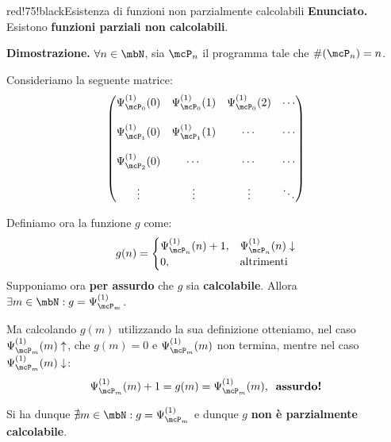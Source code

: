 \begin{halfframedbox}{red!75!black}{Esistenza di funzioni non parzialmente calcolabili}\label{Esistenza funzioni non calcolabili}
  \textbf{Enunciato. } Esistono \textbf{funzioni parziali non calcolabili}.

  \begin{center}
    \textcolor{red!75!black}{\hdashrule[0.5ex]{18cm}{1pt}{3mm 3pt 1mm 2pt}}
  \end{center}

  \textbf{Dimostrazione. } \(\forall n \in \mbN\), sia \(\mcP_n\) il programma tale che \(\# (\mcP_n)=n\).

  Consideriamo la seguente matrice:
\begin{eqnarray}
  \begin{pmatrix}
    \Psi_{\mcP_0}^{(1)}(0) & \Psi_{\mcP_0}^{(1)}(1) & \Psi_{\mcP_0}^{(1)}(2) & \cdots\\
    \\
    \Psi_{\mcP_1}^{(1)}(0) & \Psi_{\mcP_1}^{(1)}(1) & \cdots & \cdots\\
    \\
    \Psi_{\mcP_2}^{(1)}(0) & \cdots & \cdots & \cdots\\
    \\
    \vdots & \vdots & \vdots & \ddots
  \end{pmatrix}
\end{eqnarray}

  Definiamo ora la funzione \(g\) come:
  \begin{equation}
    g(n)=\begin{cases}
      \Psi_{\mcP_n}^{(1)}(n)+1, & \Psi_{\mcP_n}^{(1)}(n) \downarrow\\
      0, & \text{altrimenti}
    \end{cases}
  \end{equation}
  Supponiamo ora \textbf{per assurdo} che \(g\) sia \textbf{calcolabile}. Allora \(\exists m \in \mbN: g=\Psi_{\mcP_m}^{(1)}\).

  Ma calcolando \(g(m)\) utilizzando la sua definizione otteniamo, nel caso \(\Psi_{\mcP_m}^{(1)}(m) \uparrow\), che \(g(m)=0\) e \(\Psi_{\mcP_m}^{(1)}(m)\) non termina, mentre nel caso \(\Psi_{\mcP_m}^{(1)}(m) \downarrow\):
  \begin{equation}
    \Psi_{\mcP_m}^{(1)}(m)+1=g(m)=\Psi_{\mcP_m}^{(1)}(m), \;\; \textbf{assurdo!}
  \end{equation}

  Si ha dunque \(\nexists m \in \mbN: g=\Psi_{\mcP_m}^{(1)}\) e dunque \(g\) \textbf{non è parzialmente calcolabile}.
\end{halfframedbox}

